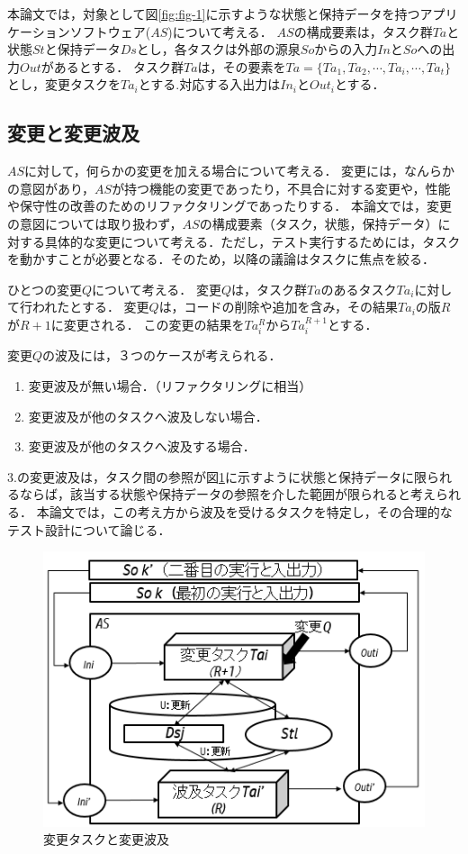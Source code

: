 \documentclass[a4paper,12pt]{jreport}
\begin{document}
本論文では，対象として図\ref{fig:fig-1}に示すような状態と保持データを持つアプリケーションソフトウェア($AS$)について考える．
$AS$の構成要素は，タスク群$Ta$と状態$St$と保持データ$Ds$とし，各タスクは外部の源泉$So$からの入力$In$と$So$への出力$Out$があるとする．
タスク群$Ta$は，その要素を$Ta=\{Ta_1,Ta_2,\cdots,Ta_i,\cdots,Ta_t \}$とし，変更タスクを$Ta_i$とする.対応する入出力は$In_i$と$Out_i$とする．

\subsection{変更と変更波及}
$AS$に対して，何らかの変更を加える場合について考える．
変更には，なんらかの意図があり，$AS$が持つ機能の変更であったり，不具合に対する変更や，性能や保守性の改善のためのリファクタリングであったりする．
本論文では，変更の意図については取り扱わず，$AS$の構成要素（タスク，状態，保持データ）に対する具体的な変更について考える．ただし，テスト実行するためには，タスクを動かすことが必要となる．そのため，以降の議論はタスクに焦点を絞る．%

ひとつの変更$Q$について考える．
変更$Q$は，タスク群$Ta$のあるタスク$Ta_i$に対して行われたとする．
変更$Q$は，コードの削除や追加を含み，その結果$Ta_i$の版$R$が$R+1$に変更される．
この変更の結果を$Ta^{R}_i$から$Ta^{R+1}_i$とする．

変更$Q$の波及には，３つのケースが考えられる．
\begin{enumerate}
  \item 変更波及が無い場合．（リファクタリングに相当）
  \item 変更波及が他のタスクへ波及しない場合．%
  \item 変更波及が他のタスクへ波及する場合．
\end{enumerate}

3.の変更波及は，タスク間の参照が図\ref{fig:fig-2}に示すように状態と保持データに限られるならば，該当する状態や保持データの参照を介した範囲が限られると考えられる．
本論文では，この考え方から波及を受けるタスクを特定し，その合理的なテスト設計について論じる．



\begin{figure}[b]
\begin{center}
\includegraphics[scale=0.5]{./image/fig-2.png}
\end{center}
\caption{変更タスクと変更波及}
\label{fig:fig-2}
\end{figure}
\end{document}
